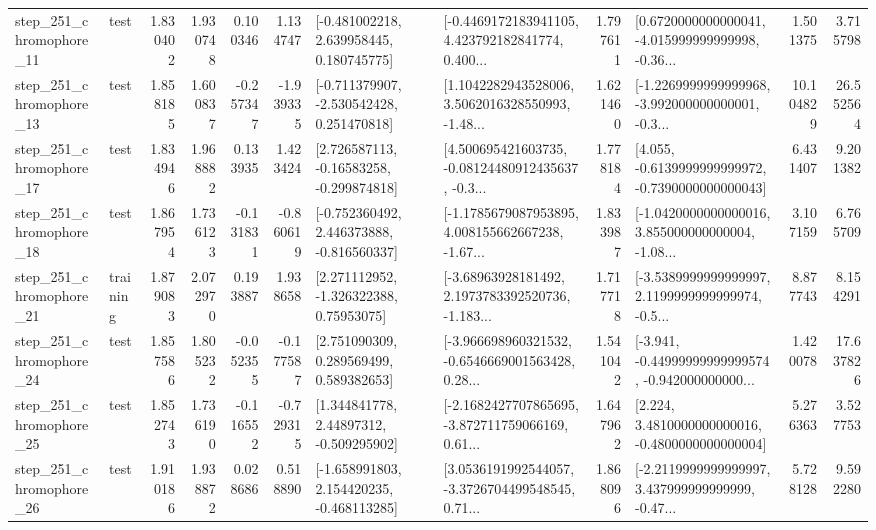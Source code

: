 \begin{tabular}{llrrrrllrlrr}
  step\_251\_chromophore\_11 &      test &      1.830402 &    1.930748 &      0.100346 &  1.134747 &    [-0.481002218, 2.639958445, 0.180745775] &  [-0.4469172183941105, 4.423792182841774, 0.400... &       1.797611 &  [0.6720000000000041, -4.015999999999998, -0.36... &            1.501375 &          3.715798 \\
  step\_251\_chromophore\_13 &      test &      1.858185 &    1.600837 &     -0.257347 & -1.939335 &   [-0.711379907, -2.530542428, 0.251470818] &  [1.1042282943528006, 3.5062016328550993, -1.48... &       1.621460 &  [-1.2269999999999968, -3.992000000000001, -0.3... &           10.104829 &         26.552564 \\
  step\_251\_chromophore\_17 &      test &      1.834946 &    1.968882 &      0.133935 &  1.423424 &    [2.726587113, -0.16583258, -0.299874818] &  [4.500695421603735, -0.08124480912435637, -0.3... &       1.778184 &  [4.055, -0.6139999999999972, -0.7390000000000043] &            6.431407 &          9.201382 \\
  step\_251\_chromophore\_18 &      test &      1.867954 &    1.736123 &     -0.131831 & -0.860619 &   [-0.752360492, 2.446373888, -0.816560337] &  [-1.1785679087953895, 4.008155662667238, -1.67... &       1.833987 &  [-1.0420000000000016, 3.855000000000004, -1.08... &            3.107159 &          6.765709 \\
  step\_251\_chromophore\_21 &  training &      1.879083 &    2.072970 &      0.193887 &  1.938658 &     [2.271112952, -1.326322388, 0.75953075] &  [-3.68963928181492, 2.1973783392520736, -1.183... &       1.717718 &  [-3.5389999999999997, 2.1199999999999974, -0.5... &            8.877743 &          8.154291 \\
  step\_251\_chromophore\_24 &      test &      1.857586 &    1.805232 &     -0.052355 & -0.177587 &     [2.751090309, 0.289569499, 0.589382653] &  [-3.966698960321532, -0.6546669001563428, 0.28... &       1.541042 &  [-3.941, -0.44999999999999574, -0.942000000000... &            1.420078 &         17.637826 \\
  step\_251\_chromophore\_25 &      test &      1.852743 &    1.736190 &     -0.116552 & -0.729315 &     [1.344841778, 2.44897312, -0.509295902] &  [-2.1682427707865695, -3.872711759066169, 0.61... &       1.647962 &   [2.224, 3.4810000000000016, -0.4800000000000004] &            5.276363 &          3.527753 \\
  step\_251\_chromophore\_26 &      test &      1.910186 &    1.938872 &      0.028686 &  0.518890 &   [-1.658991803, 2.154420235, -0.468113285] &  [3.0536191992544057, -3.3726704499548545, 0.71... &       1.868096 &  [-2.2119999999999997, 3.437999999999999, -0.47... &            5.728128 &          9.592280 \\

\end{tabular}
